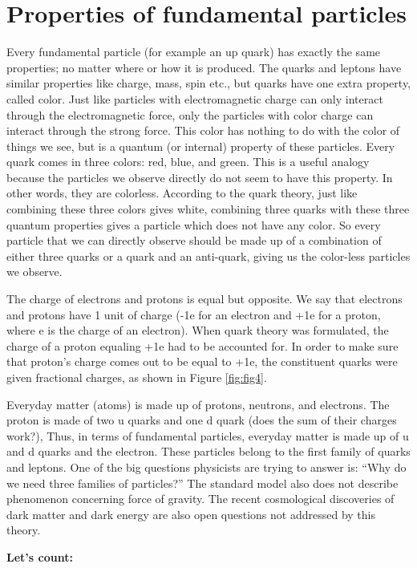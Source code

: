 \section{Properties of fundamental particles}
Every fundamental particle (for example an up quark) has exactly the same properties; no matter where or how it is produced. The quarks and leptons have similar properties like charge, mass, spin etc., but quarks have one extra property, called color. Just like particles with electromagnetic charge can only interact through the electromagnetic force, only the particles with color charge can interact through the strong force. This color has nothing to do with the color of things we see, but is a quantum (or internal) property of these particles. Every quark comes in three colors: red, blue, and green. This is a useful analogy because the particles we observe directly do not seem to have this property. In other words, they are colorless. According to the quark theory, just like combining these three colors gives white, combining three quarks with these three quantum properties gives a particle which does not have any color. So every particle that we can directly observe should be made up of a combination of either three quarks or a quark and an anti-quark, giving us the color-less particles we observe. 

The charge of electrons and protons is equal but opposite. We say that electrons and protons have 1 unit of charge (-1e for an electron and +1e for a proton, where e is the charge of an electron). When quark theory was formulated, the charge of a proton equaling +1e had to be accounted for. In order to make sure that proton’s charge comes out to be equal to +1e, the constituent quarks were given fractional charges, as shown in Figure \ref{fig:fig4}.


Everyday matter (atoms) is made up of protons, neutrons, and electrons. The proton is made of two u quarks and one d quark (does the sum of their charges work?), Thus, in terms of fundamental particles,  everyday matter is made up of u and d quarks and the electron.  These particles belong to the first family of quarks and leptons. One of the big questions physicists are trying to answer is: 
``Why do we need three families of particles?” The standard model also does not describe phenomenon concerning force of gravity. The recent cosmological discoveries of dark matter and dark energy are also open questions not addressed by this theory. 

{\bf Let’s count:} 

